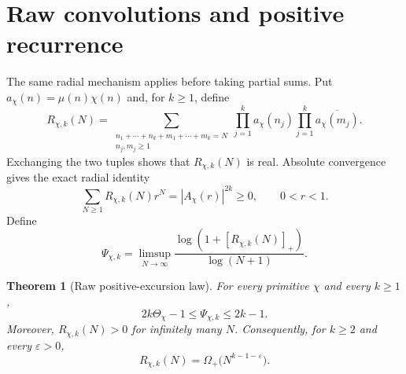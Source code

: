 \documentclass[11pt]{article}
\newtheorem{theorem}{Theorem}[section]
\theoremstyle{remark}
\newcommand{\eps}{\varepsilon}
\begin{document}
\section{Raw convolutions and positive recurrence}
\label{sec:raw}

The same radial mechanism applies before taking partial sums.  Put
$a_\chi(n)=\mu(n)\chi(n)$ and, for $k\geq1$, define
\begin{equation}
 R_{\chi,k}(N)=
 \sum_{\substack{n_1+\cdots+n_k+m_1+\cdots+m_k=N\\n_j,m_j\geq1}}
 \prod_{j=1}^k a_\chi(n_j)
 \prod_{j=1}^k\overline{a_\chi(m_j)}.
 \tag{4.1}
\end{equation}
Exchanging the two tuples shows that $R_{\chi,k}(N)$ is real.  Absolute convergence gives the
exact radial identity
\begin{equation}
 \sum_{N\geq1}R_{\chi,k}(N)r^N=|A_\chi(r)|^{2k}\geq0,
 \qquad 0<r<1.
 \tag{4.2}
\end{equation}
Define
\begin{equation}
 \Psi_{\chi,k}=\limsup_{N\to\infty}
 \frac{\log(1+[R_{\chi,k}(N)]_+)}{\log(N+1)}.
 \tag{4.3}
\end{equation}

\begin{theorem}[Raw positive-excursion law]
\label{thm:raw}
For every primitive $\chi$ and every $k\geq1$,
\begin{equation}
 2k\Theta_\chi-1\leq\Psi_{\chi,k}\leq2k-1.
 \tag{4.4}
\end{equation}
Moreover, $R_{\chi,k}(N)>0$ for infinitely many $N$.  Consequently, for $k\geq2$ and every
$\eps>0$,
\begin{equation}
 R_{\chi,k}(N)=\Omega_+\bigl(N^{k-1-\eps}\bigr).
 \tag{4.5}
\end{equation}
\end{theorem}
\end{document}
